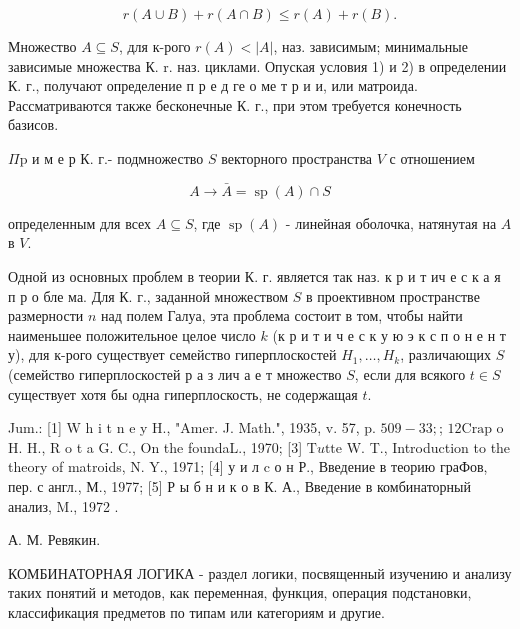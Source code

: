 \documentclass[10pt]{article}
\begin{document}
\[

r(A \cup B)+r(A \cap B) \leqslant r(A)+r(B) .

\]



Множество $A \subseteq S$, для к-рого $r(A)<|A|$, наз. зависимым; минимальные зависимые множества К. r. наз. циклами. Опуская условия 1) и 2) в определении К. г., получают определение п р е д ге о ме т р и и, или матроида. Рассматриваются также бесконечные К. г., при этом требуется конечность базисов.



$\Pi \mathrm{p}$ и м е р К. г.- подмножество $S$ векторного пространства $V$ с отношением



\[

A \rightarrow \bar{A}=\operatorname{sp}(A) \cap S

\]



определенным для всех $A \subseteq S$, где $\operatorname{sp}(A)$ - линейная оболочка, натянутая на $A$ в $V$.



Одной из основных проблем в теории К. г. является так наз. к р и т ич е с к а я п р о бле ма. Для К. г., заданной множеством $S$ в проективном пространстве размерности $n$ над полем Галуа, эта проблема состоит в том, чтобы найти наименьшее положительное целое число $k$ (к р и т и ч е с к у ю э к с п о н е н т у), для к-рого существует семейство гиперплоскостей $H_{1}, \ldots, H_{k}$, различающих $S$ (семейство гиперплоскостей р а з лич а е т множество $S$, если для всякого $t \in S$ существует хотя бы одна гиперплоскость, не содержащая $t$.



Jum.: [1] W h i t $\mathrm{n}$ e y H., "Amer. J. Math.", 1935, v. 57, p. $509-33 ;$; $12 \mathrm{Crap}$ o H. H., R o t a G. C., On the foundaL., 1970; [3] $\mathrm{T} u \mathrm{t} \mathrm{t} \mathrm{e}$ W. T., Introduction to the theory of matroids, N. Y., 1971; [4] у и л c о н Р., Введение в теорию граФов, пер. с англ., М., 1977; [5] Р ы б н и к о в К. А., Введение в комбинаторный анализ, M., 1972 .



А. М. Ревякин.



КОМБИНАТОРНАЯ ЛОГИКА - раздел логики, посвященный изучению и анализу таких понятий и методов, как переменная, функция, операция подстановки, классификация предметов по типам или категориям и другие.
\end{document}
